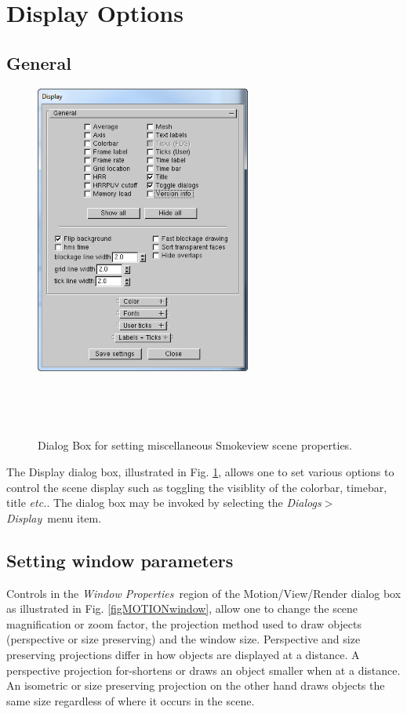 \documentclass[11pt,twoside]{book}
\begin{document}
\section{Display Options}
\subsection{General}
\begin{figure}[bph]
\centerline{\includegraphics[width=2.791667in]{FIGURES/figProperties}
}\ \caption [Dialog Box for setting miscellaneous Smokeview scene
properties.] {Dialog Box for setting miscellaneous Smokeview scene
properties.}\ \label{figProperties}
\end{figure}
The Display dialog box, illustrated in Fig.
\ref{figProperties}, allows one to set various options to control
the scene display such as toggling the visiblity of the colorbar, timebar, title {\em etc.}.  The  dialog box may be
invoked by selecting the {\em Dialogs$>$Display}\ menu item.

\subsection{Setting window parameters}
Controls in the {\em Window Properties}\ region of the Motion/View/Render dialog box as illustrated in Fig. \ref{figMOTIONwindow},
allow one to change the scene magnification or zoom factor, the
projection method used to draw objects (perspective or size preserving) and the window size.
Perspective and size preserving projections differ in how objects are displayed
at a distance.  A perspective projection for-shortens or draws an
object smaller when at a distance. An isometric or size preserving projection
on the other hand draws objects the same size regardless of
where it occurs in the scene.
\end{document}
